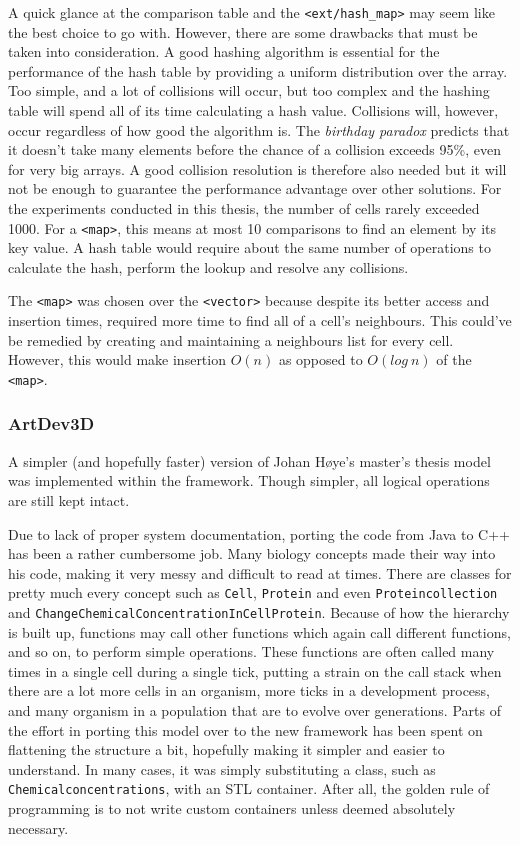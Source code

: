 A quick glance at the comparison table and the \texttt{<ext/hash\_map>} may seem like the best choice to go with. However, there are some drawbacks that must be taken into consideration. A good hashing algorithm is essential for the performance of the hash table by providing a uniform distribution over the array. Too simple, and a lot of collisions will occur, but too complex and the hashing table will spend all of its time calculating a hash value. Collisions will, however, occur regardless of how good the algorithm is. The \emph{birthday paradox} predicts that it doesn't take many elements before the chance of a collision exceeds 95\%, even for very big arrays. A good collision resolution is therefore also needed but it will not be enough to guarantee the performance advantage over other solutions. For the experiments conducted in this thesis, the number of cells rarely exceeded 1000. For a \texttt{<map>}, this means at most 10 comparisons to find an element by its key value. A hash table would require about the same number of operations to calculate the hash, perform the lookup and resolve any collisions.

The \texttt{<map>} was chosen over the \texttt{<vector>} because despite its better access and insertion times, required more time to find all of a cell's neighbours. This could've be remedied by creating and maintaining a neighbours list for every cell. However, this would make insertion $O(n)$ as opposed to $O(log~n)$ of the \texttt{<map>}.


\subsubsection{ArtDev3D}
A simpler (and hopefully faster) version of Johan H{\o}ye's master's thesis\cite{hoye2006} model was implemented within the framework. Though simpler, all logical operations are still kept intact.

Due to lack of proper system documentation, porting the code from Java to C++ has been a rather cumbersome job. Many biology concepts made their way into his code, making it very messy and difficult to read at times. There are classes for pretty much every concept such as \texttt{Cell}, \texttt{Protein} and even \texttt{Proteincollection} and \texttt{ChangeChemicalConcentrationInCellProtein}. Because of how the hierarchy is built up, functions may call other functions which again call different functions, and so on, to perform simple operations. These functions are often called many times in a single cell during a single tick, putting a strain on the call stack when there are a lot more cells in an organism, more ticks in a development process, and many organism in a population that are to evolve over generations. Parts of the effort in porting this model over to the new framework has been spent on flattening the structure a bit, hopefully making it simpler and easier to understand. In many cases, it was simply substituting a class, such as \texttt{Chemicalconcentrations}, with an STL container. After all, the golden rule of programming is to not write custom containers unless deemed absolutely necessary.

